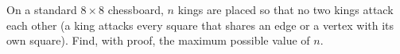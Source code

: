 On a standard $8\times8$ chessboard, $n$ kings are placed so that no two kings attack each other (a king attacks every square that shares an edge or a vertex with its own square). Find, with proof, the maximum possible value of $n$.
